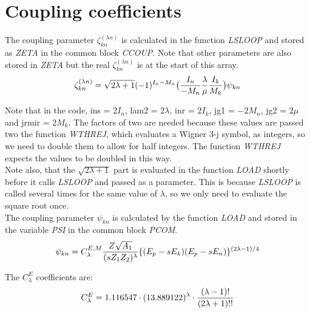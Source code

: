 \chapter{Coupling coefficients}
\label{chapt:coupling}

The coupling parameter $\zeta_{kn}^{(\lambda n)}$ is calculated in the
function {\em LSLOOP} and stored as {\em ZETA} in the common block {\em
CCOUP}. Note that other parameters are also stored in {\em ZETA} but the
real $\zeta_{kn}^{(\lambda n)}$ is at the start of this array.\\

\begin{equation}
\zeta_{kn}^{(\lambda n)} =
\sqrt{2 \lambda + 1}
(-1)^{I_n - M_n}
\big({I_n \over -M_n} {\lambda \over \mu} {I_k \over M_k}\big)
\psi_{kn}
\end{equation}

Note that in the code, ins = $2I_n$, lam2 = $2\lambda$, inr = $2I_k$, jg1 =
$-2M_n$, jg2 = $2\mu$ and jrmir = $2M_k$. The factors of two are needed
because these values are passed two the function {\em WTHREJ}, which
evaluates a Wigner 3-j symbol, as integers, so we need to double them to
allow for half integers. The function {\em WTHREJ} expects the values to be
doubled in this way.\\

Note also, that the $\sqrt{2 \lambda + 1}$ part is evaluated in the function
{\em LOAD} shortly before it calls {\em LSLOOP} and passed as a parameter.
This is because {\em LSLOOP} is called several times for the same value of
$\lambda$, so we only need to evaluate the square root once.\\

The coupling parameter $\psi_{kn}$ is calculated by the function {\em LOAD}
and stored in the variable {\em PSI} in the common block {\em PCOM}.\\

\begin{equation}
\psi_{kn} = 
C_\lambda^{E,M}
{Z \sqrt{A_1} \over (s Z_1 Z_2)^\lambda}
\{(E_p - s E_k)(E_p - s E_n)\}^{(2 \lambda - 1) / 4}
\end{equation}

The $C_\lambda^{E}$ coefficients are:\\

\begin{equation}
C_\lambda^E = 1.116547 \cdot (13.889122)^\lambda \cdot
{(\lambda - 1)! \over (2 \lambda + 1)!!}
\end{equation}

